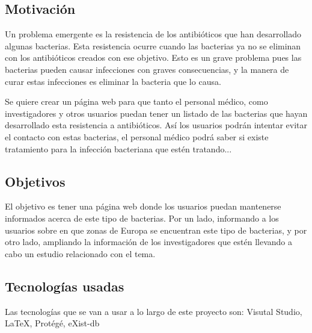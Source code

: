\documentclass[../main.tex]{subfiles}
\begin{document}
\subsection{Motivación}

Un problema emergente es la resistencia de los antibióticos que han desarrollado algunas bacterias. Esta resistencia ocurre cuando las bacterias ya no se eliminan con los antibióticos creados con ese objetivo. Esto es un grave problema pues las bacterias pueden causar infecciones con graves consecuencias, y la manera de curar estas infecciones es eliminar la bacteria que lo causa.

\hfill

Se quiere crear un página web para que tanto el personal médico, como investigadores y otros usuarios puedan tener un listado de las bacterias que hayan desarrollado esta resistencia a antibióticos. Así los usuarios podrán intentar evitar el contacto con estas bacterias, el personal médico podrá saber si existe tratamiento para la infección bacteriana que estén tratando...

\subsection{Objetivos}

El objetivo es tener una página web donde los usuarios puedan mantenerse informados acerca de este tipo de bacterias. Por un lado, informando a los usuarios sobre en que zonas de Europa se encuentran este tipo de bacterias, y por otro lado, ampliando la información de los investigadores que estén llevando a cabo un estudio relacionado con el tema.

\subsection{Tecnologías usadas}

Las tecnologías que se van a usar a lo largo de este proyecto son: Visutal Studio, \LaTeX, Protégé, eXist-db
\end{document}
